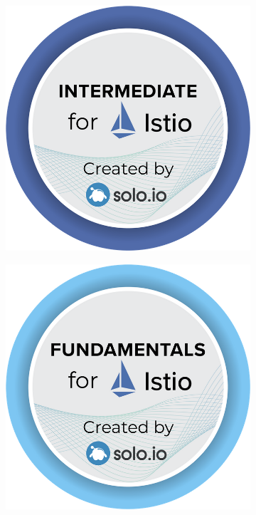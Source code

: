 \documentclass[]{friggeri-cv}
\begin{document}
\begin{figure}[h]
\begin{subfigure}[b]{0.1\linewidth}
  \end{subfigure}
  \begin{subfigure}[b]{0.1\linewidth}
    \includegraphics[width=\linewidth]{img/istio-intermediate.png}
  \end{subfigure}
  \begin{subfigure}[b]{0.1\linewidth}
    \includegraphics[width=\linewidth]{img/istio-fundamentals.png}

\end{subfigure}
\end{figure}
\end{document}
